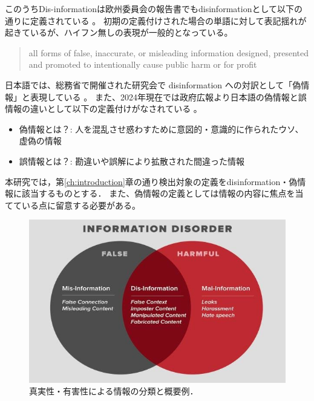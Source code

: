 このうちDis-informationは欧州委員会の報告書でもdisinformationとして以下の通りに定義されている \cite{doi/10.2759/739290}。
初期の定義付けされた場合の単語に対して表記揺れが起きているが、ハイフン無しの表現が一般的となっている。

\begin{quote}
    all forms of false, inaccurate, or misleading information designed, presented and promoted to intentionally cause public harm or for profit
\end{quote}

日本語では、総務省で開催された研究会で disinformation への対訳として「偽情報」と表現している \cite{soumuDisinfo}。
また、2024年現在では政府広報より日本語の偽情報と誤情報の違いとして以下の定義付けがなされている \cite{gov2024}。

\begin{itemize}
    \item 偽情報とは？:
    人を混乱させ惑わすために意図的・意識的に作られたウソ、虚偽の情報
    \item 誤情報とは？:
    勘違いや誤解により拡散された間違った情報
\end{itemize}

本研究では，第\ref{ch:introduction}章の通り検出対象の定義をdisinformation・偽情報に該当するものとする．
また、偽情報の定義としては情報の内容に焦点を当てている点に留意する必要がある。

\begin{figure}[p]
    \includegraphics[width=\linewidth]{figures/fig_disorder.jpg}
    \caption{真実性・有害性による情報の分類と概要例\cite{wardle2017information}．}
    \label{fig:info}
\end{figure}

